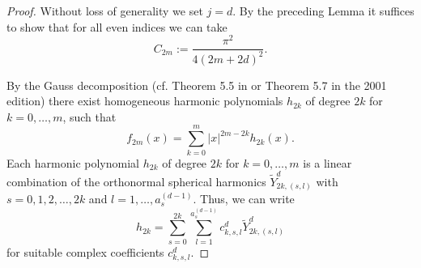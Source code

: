\documentclass[12pt]{amsart}
\begin{document}
\begin{proof} Without loss of generality we set $j = d$.
  By the preceding Lemma it suffices
to show that for all even indices we can take
$$C_{2m} := \frac{\pi^{2}}{4\left( 2m+ 2 d\right) ^{2}}.
$$


 By the Gauss
decomposition (cf. Theorem 5.5 in \cite{ABR92} or Theorem 5.7 in the 2001 edition) there exist homogeneous
harmonic polynomials $h_{2k}$ of degree $2k$ for $k=0,\dots ,m$, such that 
\begin{equation}
f_{2m} (x) =\sum_{k=0}^{m}  \left\vert x\right\vert ^{2m-2k} h_{2k}(x)\text{.}
\label{eqAlmansi1}
\end{equation}
 Each harmonic polynomial $h_{2k}$
of degree $2k$ for $k=0,\dots ,m$ is a linear combination of the orthonormal
spherical harmonics $\widetilde{Y}_{2k,\left( s,l\right) }^{d}$ with $
s=0,1,2,\dots ,2k$ and $l=1,\dots ,a_{s}^{(d-1)}$. Thus, we can write 
\begin{equation*}
h_{2k}=\sum_{s=0}^{2k}\sum_{l=1}^{a_{s}^{\left( d-1\right) }}c_{k,s,l}^{d}
\widetilde{Y}_{2k,\left( s,l\right) }^{d}
\end{equation*}
for suitable complex coefficients $c_{k,s,l}^{d}.$ \color{red} \color{black}


\end{proof}
\end{document}
